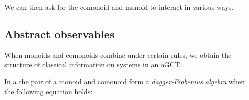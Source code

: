 We can then ask for the comonoid and monoid to interact in various ways.

\subsection{Abstract observables}

When monoids and comonoids combine under certain rules, we obtain the structure of classical information on systems in an oGCT.

\begin{defn}
\label{def:frobenius}
In a \dsmc the pair of a monoid  and comonoid  form a \emph{dagger-Frobenius algebra} when the following equation holds:
\begin{equation}
\label{eq:frobenius}

\end{equation}
\end{defn}

